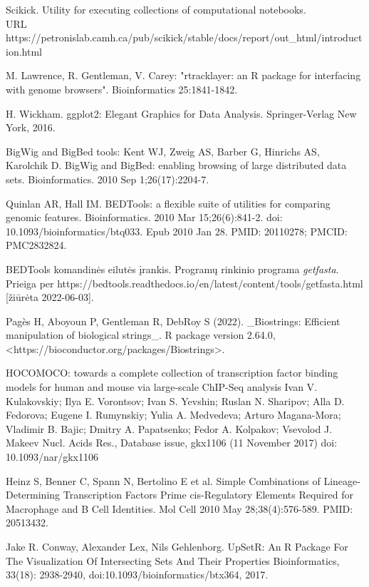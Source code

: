 \documentclass[12pt]{article}
\begin{document}
\begin{thebibliography}{99}
Scikick. Utility for executing collections
of computational notebooks.\\
URL https://petronislab.camh.ca/pub/scikick/stable/docs/report/out\_html/introduction.html

 M. Lawrence, R. Gentleman, V. Carey: "rtracklayer: an {R}
package for interfacing with genome browsers". Bioinformatics 25:1841-1842.

 H. Wickham. ggplot2: Elegant
Graphics for Data Analysis. Springer-Verlag New York, 2016.

 BigWig and BigBed tools: Kent WJ, Zweig AS, Barber G,
Hinrichs AS, Karolchik D. BigWig and BigBed: enabling browsing of large
distributed data sets. Bioinformatics. 2010 Sep 1;26(17):2204-7.

 Quinlan AR, Hall IM. BEDTools: a flexible suite of
utilities for comparing genomic features. Bioinformatics. 2010 Mar
15;26(6):841-2. doi: 10.1093/bioinformatics/btq033. Epub 2010 Jan 28.
PMID: 20110278; PMCID: PMC2832824.

 BEDTools komandinės eilutės įrankis.
Programų rinkinio programa \emph{getfasta}.\\
Prieiga per https://bedtools.readthedocs.io/en/latest/content/tools/getfasta.html
[žiūrėta 2022-06-03].

 Pagès H, Aboyoun P, Gentleman R, DebRoy S (2022). \_Biostrings:
Efficient manipulation of biological strings\_. R package version
2.64.0, <https://bioconductor.org/packages/Biostrings>.

 HOCOMOCO: towards a complete collection of transcription
factor binding models for human and mouse via large-scale ChIP-Seq analysis
Ivan V. Kulakovskiy; Ilya E. Vorontsov; Ivan S. Yevshin; Ruslan N. Sharipov;
Alla D. Fedorova; Eugene I. Rumynskiy; Yulia A. Medvedeva; Arturo Magana-Mora;
Vladimir B. Bajic; Dmitry A. Papatsenko; Fedor A. Kolpakov; Vsevolod J. Makeev
Nucl. Acids Res., Database issue, gkx1106 (11 November 2017)
doi: 10.1093/nar/gkx1106

 Heinz S, Benner C, Spann N, Bertolino E et al.
Simple Combinations of Lineage-Determining Transcription Factors
Prime cis-Regulatory Elements Required for Macrophage and B Cell
Identities. Mol Cell 2010 May 28;38(4):576-589. PMID: 20513432.

 Jake R. Conway, Alexander
Lex, Nils Gehlenborg. UpSetR: An R Package For The
Visualization Of Intersecting Sets And Their Properties
Bioinformatics, 33(18): 2938-2940,
doi:10.1093/bioinformatics/btx364, 2017.


\end{thebibliography}
\end{document}
